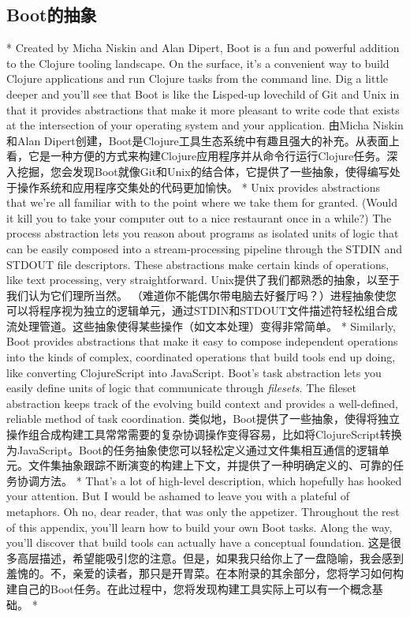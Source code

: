 \begin{paracol}{2}
\section{Boot的抽象}
\switchcolumn[0]*
Created by Micha Niskin and Alan Dipert, Boot is a fun and powerful
addition to the Clojure tooling landscape. On the surface, it's a
convenient way to build Clojure applications and run Clojure tasks from
the command line. Dig a little deeper and you'll see that Boot is like
the Lisped-up lovechild of Git and Unix in that it provides abstractions
that make it more pleasant to write code that exists at the intersection
of your operating system and your application.
\switchcolumn
由Micha Niskin和Alan Dipert创建，Boot是Clojure工具生态系统中有趣且强大的补充。从表面上看，它是一种方便的方式来构建Clojure应用程序并从命令行运行Clojure任务。深入挖掘，您会发现Boot就像Git和Unix的结合体，它提供了一些抽象，使得编写处于操作系统和应用程序交集处的代码更加愉快。
\switchcolumn[0]*
Unix provides abstractions that we're all familiar with to the point
where we take them for granted. (Would it kill you to take your computer
out to a nice restaurant once in a while?) The process abstraction lets
you reason about programs as isolated units of logic that can be easily
composed into a stream-processing pipeline through the STDIN and STDOUT
file descriptors. These abstractions make certain kinds of operations,
like text processing, very straightforward.
\switchcolumn
Unix提供了我们都熟悉的抽象，以至于我们认为它们理所当然。 （难道你不能偶尔带电脑去好餐厅吗？）进程抽象使您可以将程序视为独立的逻辑单元，通过STDIN和STDOUT文件描述符轻松组合成流处理管道。这些抽象使得某些操作（如文本处理）变得非常简单。
\switchcolumn[0]*
Similarly, Boot provides abstractions that make it easy to compose
independent operations into the kinds of complex, coordinated operations
that build tools end up doing, like converting ClojureScript into
JavaScript. Boot's task abstraction lets you easily define units of
logic that communicate through \emph{filesets}. The fileset abstraction
keeps track of the evolving build context and provides a well-defined,
reliable method of task coordination.
\switchcolumn
类似地，Boot提供了一些抽象，使得将独立操作组合成构建工具常常需要的复杂协调操作变得容易，比如将ClojureScript转换为JavaScript。Boot的任务抽象使您可以轻松定义通过文件集相互通信的逻辑单元。文件集抽象跟踪不断演变的构建上下文，并提供了一种明确定义的、可靠的任务协调方法。
\switchcolumn[0]*
That's a lot of high-level description, which hopefully has hooked your
attention. But I would be ashamed to leave you with a plateful of
metaphors. Oh no, dear reader, that was only the appetizer. Throughout
the rest of this appendix, you'll learn how to build your own Boot
tasks. Along the way, you'll discover that build tools can actually have
a conceptual foundation.
\switchcolumn
这是很多高层描述，希望能吸引您的注意。但是，如果我只给你上了一盘隐喻，我会感到羞愧的。不，亲爱的读者，那只是开胃菜。在本附录的其余部分，您将学习如何构建自己的Boot任务。在此过程中，您将发现构建工具实际上可以有一个概念基础。
\switchcolumn[0]*

\end{paracol}

